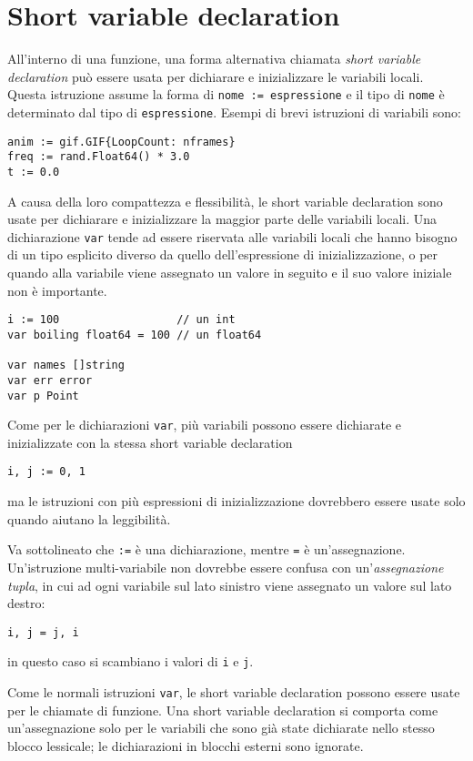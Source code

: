 \section{Short variable declaration}
\label{sec:short_variable_declaration}%
All'interno di una funzione, una forma alternativa chiamata \textit{short variable declaration} può essere usata per dichiarare e inizializzare le variabili locali.
Questa istruzione assume la forma di \verb|nome := espressione| e il tipo di \verb|nome| è determinato dal tipo di \verb|espressione|.
Esempi di brevi istruzioni di variabili sono:
\begin{lstlisting}[frame=single, label={lst:lstlisting1-3-1.1}]
anim := gif.GIF{LoopCount: nframes}
freq := rand.Float64() * 3.0
t := 0.0
\end{lstlisting}
A causa della loro compattezza e flessibilità, le short variable declaration sono usate per dichiarare e inizializzare la maggior parte delle variabili locali.
Una dichiarazione \verb|var| tende ad essere riservata alle variabili locali che hanno bisogno di un tipo esplicito diverso da quello dell'espressione di inizializzazione, o per quando alla variabile viene assegnato un valore in seguito e il suo valore iniziale non è importante.
\begin{lstlisting}[frame=single, label={lst:lstlisting1-3-1.2}]
i := 100                  // un int
var boiling float64 = 100 // un float64

var names []string
var err error
var p Point
\end{lstlisting}
Come per le dichiarazioni \verb|var|, più variabili possono essere dichiarate e inizializzate con la stessa short variable declaration
\begin{lstlisting}[frame=single, label={lst:lstlisting1-3-1.3}]
i, j := 0, 1
\end{lstlisting}
ma le istruzioni con più espressioni di inizializzazione dovrebbero essere usate solo quando aiutano la leggibilità.

Va sottolineato che \verb|:=| è una dichiarazione, mentre \verb|=| è un'assegnazione.
Un'istruzione multi-variabile non dovrebbe essere confusa con un'\textit{assegnazione tupla}, in cui ad ogni variabile sul lato sinistro viene assegnato un valore sul lato destro:
\begin{lstlisting}[frame=single, label={lst:lstlisting1-3-1.4}]
i, j = j, i
\end{lstlisting}
in questo caso si scambiano i valori di \verb|i| e \verb|j|.

Come le normali istruzioni \verb|var|, le short variable declaration possono essere usate per le chiamate di funzione.
Una short variable declaration si comporta come un'assegnazione solo per le variabili che sono già state dichiarate nello stesso blocco lessicale;
le dichiarazioni in blocchi esterni sono ignorate.

